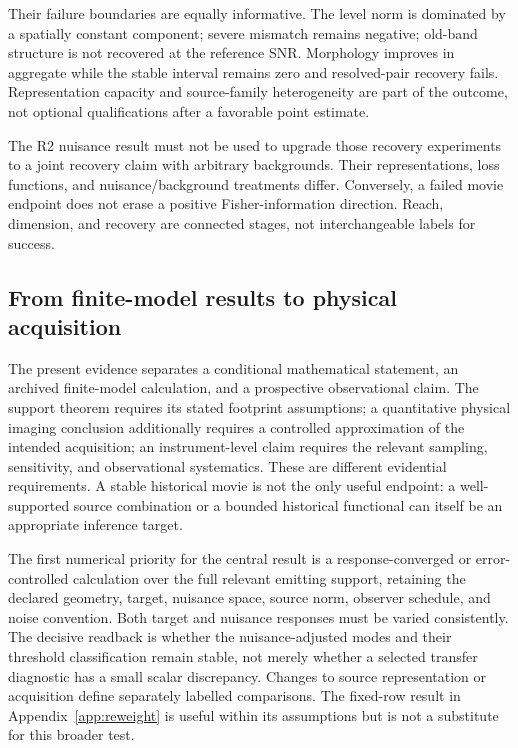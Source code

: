 Their failure boundaries are equally informative. The level norm is dominated by a spatially constant component; severe mismatch remains negative; old-band structure is not recovered at the reference SNR. Morphology improves in aggregate while the stable interval remains zero and resolved-pair recovery fails. Representation capacity and source-family heterogeneity are part of the outcome, not optional qualifications after a favorable point estimate.

The R2 nuisance result must not be used to upgrade those recovery experiments to a joint recovery claim with arbitrary backgrounds. Their representations, loss functions, and nuisance/background treatments differ. Conversely, a failed movie endpoint does not erase a positive Fisher-information direction. Reach, dimension, and recovery are connected stages, not interchangeable labels for success.

\subsection{From finite-model results to physical acquisition}
The present evidence separates a conditional mathematical statement, an archived finite-model calculation, and a prospective observational claim. The support theorem requires its stated footprint assumptions; a quantitative physical imaging conclusion additionally requires a controlled approximation of the intended acquisition; an instrument-level claim requires the relevant sampling, sensitivity, and observational systematics. These are different evidential requirements. A stable historical movie is not the only useful endpoint: a well-supported source combination or a bounded historical functional can itself be an appropriate inference target.

The first numerical priority for the central result is a response-converged or error-controlled calculation over the full relevant emitting support, retaining the declared geometry, target, nuisance space, source norm, observer schedule, and noise convention. Both target and nuisance responses must be varied consistently. The decisive readback is whether the nuisance-adjusted modes and their threshold classification remain stable, not merely whether a selected transfer diagnostic has a small scalar discrepancy. Changes to source representation or acquisition define separately labelled comparisons. The fixed-row result in Appendix~\ref{app:reweight} is useful within its assumptions but is not a substitute for this broader test.

